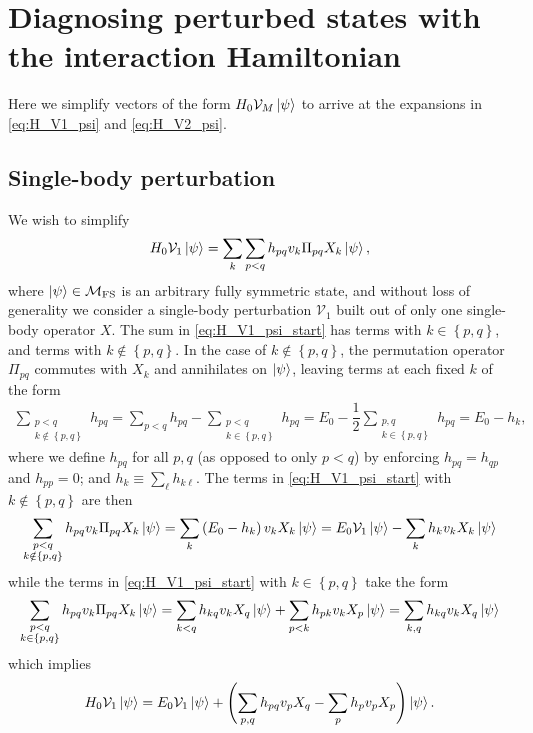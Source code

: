 \documentclass[nofootinbib,notitlepage,11pt]{revtex4-2}
\newcommand{\f}[2]{\dfrac{#1}{#2}} %
\newcommand{\p}[1]{\left(#1\right)} %
\renewcommand{\set}[1]{\left\{#1\right\}} %
\newcommand{\1}{\mathds{1}}
\newcommand{\M}{\mathcal{M}}
\newcommand{\V}{\mathcal{V}}
\newcommand{\FS}{\text{FS}}
\begin{document}
\section{Diagnosing perturbed states with the interaction Hamiltonian}

Here we simplify vectors of the form $H_0\V_M\ket\psi$ to arrive at
the expansions in \eqref{eq:H_V1_psi} and \eqref{eq:H_V2_psi}.

\subsection{Single-body perturbation}
\label{sec:H_V1_psi}

We wish to simplify
\begin{align}
  H_0 \V_1 \ket\psi
  = \sum_k \sum_{p<q} h_{pq} v_k \Pi_{pq} X_k \ket\psi,
  \label{eq:H_V1_psi_start}
\end{align}
where $\ket\psi\in\M_\FS$ is an arbitrary fully symmetric state, and
without loss of generality we consider a single-body perturbation
$\V_1$ built out of only one single-body operator $X$.  The sum in
\eqref{eq:H_V1_psi_start} has terms with $k\in\set{p,q}$, and terms
with $k\notin\set{p,q}$.  In the case of $k\notin\set{p,q}$, the
permutation operator $\Pi_{pq}$ commutes with $X_k$ and annihilates on
$\ket\psi$, leaving terms at each fixed $k$ of the form
\begin{align}
  \sum_{\substack{p<q\\k\notin\set{p,q}}} h_{pq}
  = \sum_{p<q} h_{pq} - \sum_{\substack{p<q\\k\in\set{p,q}}} h_{pq}
  = E_0 - \f12 \sum_{\substack{p,q\\k\in\set{p,q}}} h_{pq}
  = E_0 - h_k,
\end{align}
where we define $h_{pq}$ for all $p,q$ (as opposed to only $p<q$) by
enforcing $h_{pq}=h_{qp}$ and $h_{pp}=0$; and
$h_k \equiv \sum_\ell h_{k\ell}$.  The terms in
\eqref{eq:H_V1_psi_start} with $k\notin\set{p,q}$ are then
\begin{align}
  \sum_{\substack{p<q\\k\notin\set{p,q}}}
  h_{pq} v_k \Pi_{pq} X_k \ket\psi
  = \sum_k \p{E_0 - h_k} v_k X_k \ket\psi
  = E_0 \V_1 \ket\psi - \sum_k h_k v_k X_k \ket\psi
\end{align}
while the terms in \eqref{eq:H_V1_psi_start} with $k\in\set{p,q}$ take
the form
\begin{align}
  \sum_{\substack{p<q\\k\in\set{p,q}}}
  h_{pq} v_k \Pi_{pq} X_k \ket\psi
  = \sum_{k<q} h_{kq} v_k X_q \ket\psi
  + \sum_{p<k} h_{pk} v_k X_p \ket\psi
  = \sum_{k,q} h_{kq} v_k X_q \ket\psi
\end{align}
which implies
\begin{align}
  H_0 \V_1 \ket\psi
  = E_0 \V_1 \ket\psi
  + \p{\sum_{p,q} h_{pq} v_p X_q - \sum_p h_p v_p X_p}
  \ket\psi.
\end{align}
\end{document}
